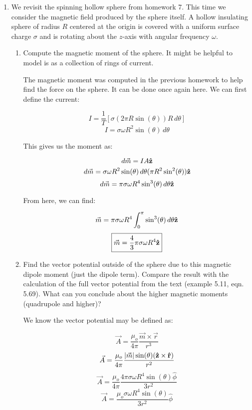 \begin{enumerate}

  \item We revisit the spinning hollow sphere from homework 7. This time we consider the magnetic field produced by the sphere itself.  A hollow insulating sphere of radius $R$ centered at the origin is covered with a uniform surface charge $\sigma$ and is rotating about the $z$-axis with angular frequency $\omega$.

    \begin{enumerate}

      \item Compute the magnetic moment of the sphere. It might be helpful to model is as a collection of rings of current.

        The magnetic moment was computed in the previous homework to help find the force on the sphere. It can be done once again here. We can first define the current:

        $$I=\frac{1}{T}\left[ \sigma(2\pi R\sin(\theta))R\,d\theta \right]$$
        $$I=\sigma \omega R^2\sin(\theta)\,d\theta$$

        This gives us the moment as:

        $$d\vec{m}=IA\bold{\hat{z}}$$
        $$d\vec{m}=\sigma\omega R^2\sin(\theta)\,d\theta (\pi R^2\sin^2(\theta))\bold{\hat{z}}$$
        $$d\vec{m}=\pi\sigma\omega R^4\sin^3(\theta)\,d\theta\bold{\hat{z}}$$

        From here, we can find:

        $$\vec{m}=\pi\sigma\omega R^4\int_0^\pi\sin^3(\theta)\,d\theta\bold{\hat{z}}$$
        $$\boxed{\vec{m}=\frac{4}{3}\pi\sigma\omega R^4\bold{\hat{z}}}$$

      \item Find the vector potential outside of the sphere due to this magnetic dipole moment (just the dipole term). Compare the result with the calculation of the full vector potential from the text (example 5.11, eqn. 5.69).  What can you conclude about the higher magnetic moments (quadrupole and higher)?

        We know the vector potential may be defined as:

        $$\vec{A}=\frac{\mu_o}{4\pi}\frac{\vec{m}\times\vec{r}}{r^3}$$
        $$\vec{A}=\frac{\mu_o}{4\pi}\frac{|\vec{m}|\sin(\theta)(\bold{\hat{z}}\times\bold{\hat{r}})}{r^2}$$
        $$\vec{A}=\frac{\mu_o}{4\pi}\frac{4\pi\sigma\omega R^4\sin(\theta)\hat{\phi}}{3r^2}$$
        $$\boxed{\vec{A}=\frac{\mu_o\sigma\omega R^4\sin(\theta)}{3r^2}\hat{\phi}}$$


\end{enumerate}
\end{enumerate}
